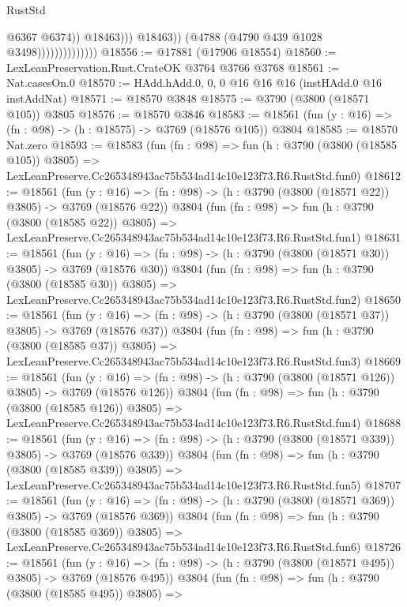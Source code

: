 \begin{lexlean}{RustStd}
\begin{coremodule}
                                          @6367
                                          @6374))
                                      @18463)))
                                @18463))
                            (@4788 (@4790 @439 @1028 @3498))))))))))))))
@18556 := @17881 (@17906 @18554)
@18560 := LexLeanPreservation.Rust.CrateOK @3764 @3766 @3768
@18561 := Nat.casesOn.{0}
@18570 := HAdd.hAdd.{0, 0, 0} @16 @16 @16 (instHAdd.{0} @16 instAddNat)
@18571 := @18570 @3848
@18575 := @3790 (@3800 (@18571 @105)) @3805
@18576 := @18570 @3846
@18583 := @18561 (fun (y : @16) => (fn : @98) -> (h : @18575) -> @3769 (@18576 @105)) @3804
@18585 := @18570 Nat.zero
@18593 := @18583
    (fun (fn : @98) =>
    fun (h : @3790 (@3800 (@18585 @105)) @3805) =>
    LexLeanPreserve.Cc265348943ac75b534ad14c10e123f73.R6.RustStd.fun0)
@18612 := @18561
    (fun (y : @16) => (fn : @98) -> (h : @3790 (@3800 (@18571 @22)) @3805) -> @3769 (@18576 @22))
    @3804
    (fun (fn : @98) =>
    fun (h : @3790 (@3800 (@18585 @22)) @3805) =>
    LexLeanPreserve.Cc265348943ac75b534ad14c10e123f73.R6.RustStd.fun1)
@18631 := @18561
    (fun (y : @16) => (fn : @98) -> (h : @3790 (@3800 (@18571 @30)) @3805) -> @3769 (@18576 @30))
    @3804
    (fun (fn : @98) =>
    fun (h : @3790 (@3800 (@18585 @30)) @3805) =>
    LexLeanPreserve.Cc265348943ac75b534ad14c10e123f73.R6.RustStd.fun2)
@18650 := @18561
    (fun (y : @16) => (fn : @98) -> (h : @3790 (@3800 (@18571 @37)) @3805) -> @3769 (@18576 @37))
    @3804
    (fun (fn : @98) =>
    fun (h : @3790 (@3800 (@18585 @37)) @3805) =>
    LexLeanPreserve.Cc265348943ac75b534ad14c10e123f73.R6.RustStd.fun3)
@18669 := @18561
    (fun (y : @16) => (fn : @98) -> (h : @3790 (@3800 (@18571 @126)) @3805) -> @3769 (@18576 @126))
    @3804
    (fun (fn : @98) =>
    fun (h : @3790 (@3800 (@18585 @126)) @3805) =>
    LexLeanPreserve.Cc265348943ac75b534ad14c10e123f73.R6.RustStd.fun4)
@18688 := @18561
    (fun (y : @16) => (fn : @98) -> (h : @3790 (@3800 (@18571 @339)) @3805) -> @3769 (@18576 @339))
    @3804
    (fun (fn : @98) =>
    fun (h : @3790 (@3800 (@18585 @339)) @3805) =>
    LexLeanPreserve.Cc265348943ac75b534ad14c10e123f73.R6.RustStd.fun5)
@18707 := @18561
    (fun (y : @16) => (fn : @98) -> (h : @3790 (@3800 (@18571 @369)) @3805) -> @3769 (@18576 @369))
    @3804
    (fun (fn : @98) =>
    fun (h : @3790 (@3800 (@18585 @369)) @3805) =>
    LexLeanPreserve.Cc265348943ac75b534ad14c10e123f73.R6.RustStd.fun6)
@18726 := @18561
    (fun (y : @16) => (fn : @98) -> (h : @3790 (@3800 (@18571 @495)) @3805) -> @3769 (@18576 @495))
    @3804
    (fun (fn : @98) =>
    fun (h : @3790 (@3800 (@18585 @495)) @3805) =>

\end{coremodule}
\end{lexlean}
